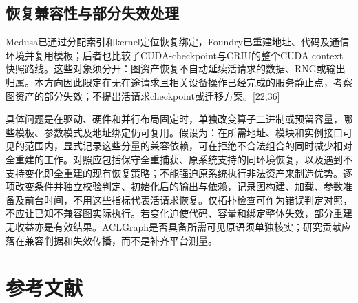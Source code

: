 \documentclass[
  UTF8,
  zihao=5]{ctexart}
\begin{document}
\hypertarget{ux6062ux590dux517cux5bb9ux6027ux4e0eux90e8ux5206ux5931ux6548ux5904ux7406}{%
\subsection*{恢复兼容性与部分失效处理}\label{ux6062ux590dux517cux5bb9ux6027ux4e0eux90e8ux5206ux5931ux6548ux5904ux7406}}

Medusa已通过分配索引和kernel定位恢复绑定，Foundry已重建地址、代码及通信环境并复用模板；后者也比较了CUDA-checkpoint与CRIU的整个CUDA
context快照路线。这些对象须分开：图资产恢复不自动延续活请求的数据、RNG或输出归属。本方向因此限定在无在途请求且相关设备操作已经完成的服务静止点，考察图资产的部分失效；不提出活请求checkpoint或迁移方案。{[}\protect\hyperlink{ref-liu2026foundry}{22},\protect\hyperlink{ref-zeng2025medusa}{36}{]}

具体问题是在驱动、硬件和并行布局固定时，单独改变算子二进制或预留容量，哪些模板、参数模式及地址绑定仍可复用。假设为：在所需地址、模块和实例接口可见的范围内，显式记录这些分量的兼容依赖，可在拒绝不合法组合的同时减少相对全重建的工作。对照应包括保守全重捕获、原系统支持的同环境恢复，以及遇到不支持变化即全重建的现有恢复策略；不能强迫原系统执行非法资产来制造优势。逐项改变条件并独立校验判定、初始化后的输出与依赖，记录图构建、加载、参数准备及前台时间，不用这些指标代表活请求恢复。仅拓扑检查可作为错误判定对照，不应让已知不兼容图实际执行。若变化迫使代码、容量和绑定整体失效，部分重建无收益亦是有效结果。ACLGraph是否具备所需可见原语须单独核实；研究贡献应落在兼容判据和失效传播，而不是补齐平台测量。

\hypertarget{ux53c2ux8003ux6587ux732e}{%
\section*{参考文献}\label{ux53c2ux8003ux6587ux732e}}
\end{document}
